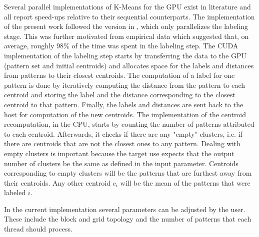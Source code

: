 Several parallel implementations of K-Means for the GPU exist in literature \cite{Bai2009,Zechner2009,Sirotkovi2012} and all report speed-ups relative to their sequential counterparts.
The implementation of the present work followed the version in \cite{Zechner2009b}, which only parallelizes the labeling stage. %
This was further motivated from empirical data which suggested that, on average, roughly $98 \%$ of the time was spent in the labeling step.
The CUDA implementation of the labeling step starts by transferring the data to the GPU (pattern set and initial centroids) and allocates space for the labels and distances from patterns to their closest centroids.
The computation of a label for one pattern is done by iteratively computing the distance from the pattern to each centroid and storing the label and the distance corresponding to the closest centroid to that pattern.
Finally, the labels and distances are sent back to the host for computation of the new centroids.
The implementation of the centroid recomputation, in the CPU, starts by counting the number of patterns attributed to each centroid.
Afterwards, it checks if there are any "empty" clusters, i.e. if there are centroids that are not the closest ones to any pattern.
Dealing with empty clusters is important because the target use expects that the output number of clusters be the same as defined in the input parameter.
Centroids corresponding to empty clusters will be the patterns that are furthest away from their centroids.
Any other centroid $c_i$ will be the mean of the patterns that were labeled $i$.

In the current implementation several parameters can be adjusted by the user.
These include the block and grid topology and the number of patterns that each thread should process.